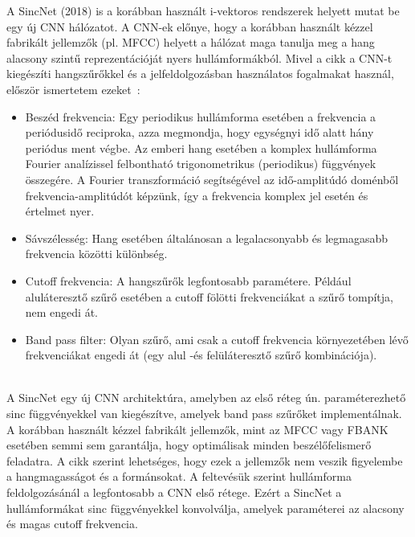 A SincNet (2018) is a korábban használt i-vektoros rendszerek helyett mutat be egy új CNN hálózatot. A CNN-ek előnye, hogy a korábban használt kézzel fabrikált jellemzők (pl. MFCC) helyett a hálózat maga tanulja meg a hang alacsony szintű reprezentációját nyers hullámformákból. Mivel a cikk a CNN-t kiegészíti hangszűrőkkel és a jelfeldolgozásban használatos fogalmakat használ, először ismertetem ezeket~\cite{sincnet}:
\begin{itemize}
	\item Beszéd frekvencia: Egy periodikus hullámforma esetében a frekvencia a periódusidő reciproka, azza megmondja, hogy egységnyi idő alatt hány periódus ment végbe. Az emberi hang esetében a komplex hullámforma Fourier analízissel felbontható trigonometrikus (periodikus) függvények összegére. A Fourier transzformáció segítségével az idő-amplitúdó doménből frekvencia-amplitúdót képzünk, így a frekvencia komplex jel esetén és értelmet nyer.
	\item Sávszélesség: Hang esetében általánosan a legalacsonyabb és legmagasabb frekvencia közötti különbség.
	\item Cutoff frekvencia: A hangszűrők legfontosabb paramétere. Például aluláteresztő szűrő esetében a cutoff fölötti frekvenciákat a szűrő tompítja, nem engedi át.
	\item Band pass filter: Olyan szűrő, ami csak a cutoff frekvencia környezetében lévő frekvenciákat engedi át (egy alul -és felüláteresztő szűrő kombinációja).
\end{itemize} 
\ \\
\newline
A SincNet egy új CNN architektúra, amelyben az első réteg ún. paraméterezhető sinc függvényekkel van kiegészítve, amelyek band pass szűrőket implementálnak.
\newline
\newline
A korábban használt kézzel fabrikált jellemzők, mint az MFCC vagy FBANK esetében semmi sem garantálja, hogy optimálisak minden beszélőfelismerő feladatra. A cikk szerint lehetséges, hogy ezek a jellemzők nem veszik figyelembe a hangmagasságot és a formánsokat. A feltevésük szerint hullámforma feldolgozásánál a legfontosabb a CNN első rétege. Ezért a SincNet a hullámformákat sinc függvényekkel konvolválja, amelyek paraméterei az alacsony és magas cutoff frekvencia.


